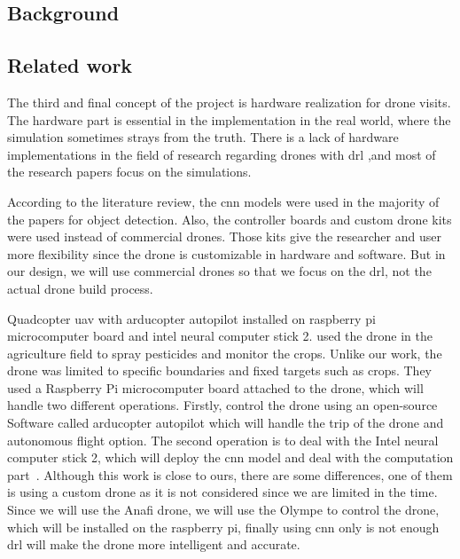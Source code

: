 \documentclass[../main.tex]{subfiles}
\begin{document}
\subsection{Background}

\blindtext

\subsection{Related work}


The third and final concept of the project is hardware realization for drone visits. The hardware part is essential in the implementation in the real world, where the simulation sometimes strays from the truth.
There is a lack of hardware implementations in the field of research regarding drones with \gls{drl} ,and most of the research papers focus on the simulations.

According to the literature review, 
the \gls{cnn} models were used in the majority of the papers for object detection. 
Also, the controller boards and custom drone kits were used instead of commercial drones. Those kits give the researcher and user more flexibility since the drone is customizable in hardware and software. But in our design, we will use commercial drones so that we focus on the \gls{drl}, not the actual drone build process. 


Quadcopter \gls{uav} with arducopter autopilot installed on raspberry pi microcomputer board and intel neural computer stick 2.
\citeauthor{Khan21} used the drone in the agriculture field to spray pesticides and monitor the crops. Unlike our work, the drone was limited to specific
boundaries and fixed targets such as crops.
They used a Raspberry Pi microcomputer board attached to the drone, which will handle two different operations. Firstly, control the drone using an open-source Software called arducopter autopilot which will handle the trip of the drone and autonomous flight option. The second operation is to deal with the Intel neural computer stick 2, which will deploy the \gls{cnn} model and deal with the computation part~\cite{Khan21}.
Although this work is close to ours, there are some differences, 
one of them is using a custom drone as it is not considered since we are limited in the time.
Since we will use the Anafi drone, we will use the Olympe to control the drone, which will be installed on the raspberry pi, finally using \gls{cnn} only is not enough \gls{drl} will make the drone more intelligent and accurate.
\end{document}
